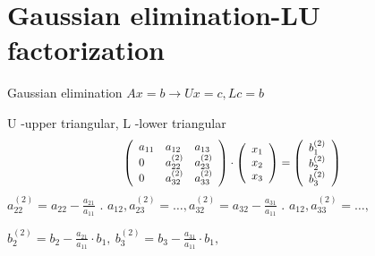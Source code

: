\section{Gaussian elimination-LU factorization}
\begin{frame}{Gaussian elimination}
$Ax=b\rightarrow Ux=c, Lc=b$

$\mathrm{U}$ -upper triangular, $\mathrm{L}$ -lower triangular
$$
\scalebox{0.90}{
$
\left(\begin{array}{lll}
a_{11} & a_{12} & a_{13}\\
0 & a_{22}^{(2)} &a_{23}^{(2)}\\
0 & a_{32}^{(2)} & a_{33}^{(2)}
\end{array}\right) \cdot
 \left(\begin{array}{l}
x_{1}\\
x_{2}\\
x_{3}
\end{array}\right)=
\left(\begin{array}{l}
b_{1}^{(2)} \\
b_{2}^{(2)} \\
b_{3}^{(2)}
\end{array}\right)
$
}
$$
$a_{22}^{(2)}=a_{22}-\displaystyle \frac{a_{21}}{a_{11}}$ . $a_{12}, a_{23}^{(2)}=\ldots, a_{32}^{(2)}=a_{32}-\displaystyle \frac{a_{31}}{a_{11}}$ . $a_{12}, a_{33}^{(2)}=\ldots,$

\begin{flushright}
$
b_{2}^{(2)}=b_{2}-\frac{a_{21}}{a_{11}}\cdot b_{1},\ b_{3}^{(2)}=b_{3}-\frac{a_{31}}{a_{11}}\cdot b_{1},
$
\end{flushright}

\end{frame}
